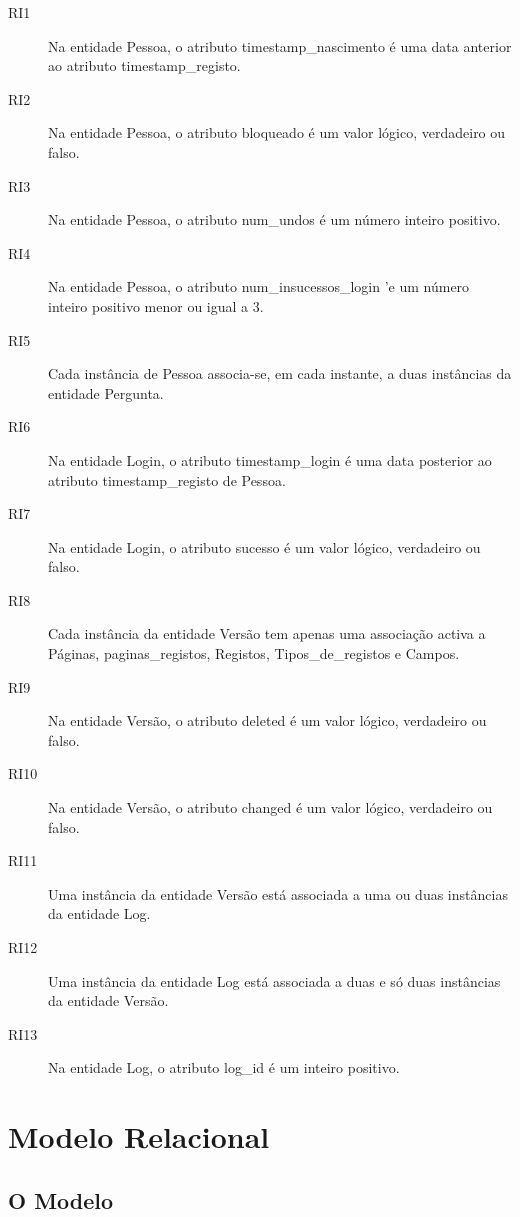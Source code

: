 \documentclass[11pt,a4paper]{article}
\begin{document}
\begin{description}
  \item[RI1] Na entidade Pessoa, o atributo timestamp\_nascimento \'{e} uma data anterior ao atributo timestamp\_registo.
  \item[RI2] Na entidade Pessoa, o atributo bloqueado \'{e} um valor l\'{o}gico, verdadeiro ou falso.


  \item[RI3] Na entidade Pessoa, o atributo num\_undos \'{e} um n\'{u}mero inteiro positivo.


  \item[RI4] Na entidade Pessoa, o atributo num\_insucessos\_login '{e} um n\'{u}mero inteiro positivo menor ou igual a 3.
  \item[RI5] Cada instância de Pessoa associa-se, em cada instante, a duas instâncias da entidade Pergunta.
  \item[RI6] Na entidade Login, o atributo timestamp\_login \'{e} uma data posterior ao atributo timestamp\_registo de Pessoa.
  \item[RI7] Na entidade Login, o atributo sucesso \'{e} um valor l\'{o}gico, verdadeiro ou falso.
  \item[RI8] Cada instância da entidade Versão tem apenas uma associação activa a P\'{a}ginas, paginas\_registos, Registos, Tipos\_de\_registos e Campos.
  \item[RI9] Na entidade Versão, o atributo deleted \'{e} um valor l\'{o}gico, verdadeiro ou falso.
  \item[RI10] Na entidade Versão, o atributo changed \'{e} um valor l\'{o}gico, verdadeiro ou falso.
  \item[RI11] Uma instância da entidade Versão est\'{a} associada a uma ou duas instâncias da entidade Log.
  \item[RI12] Uma instância da entidade Log está associada a duas e s\'{o} duas instâncias da entidade Versão.
  \item[RI13] Na entidade Log, o atributo log\_id \'{e} um inteiro positivo.
\end{description}

\newpage
\section{Modelo Relacional}
\subsection{O Modelo}
\end{document}
